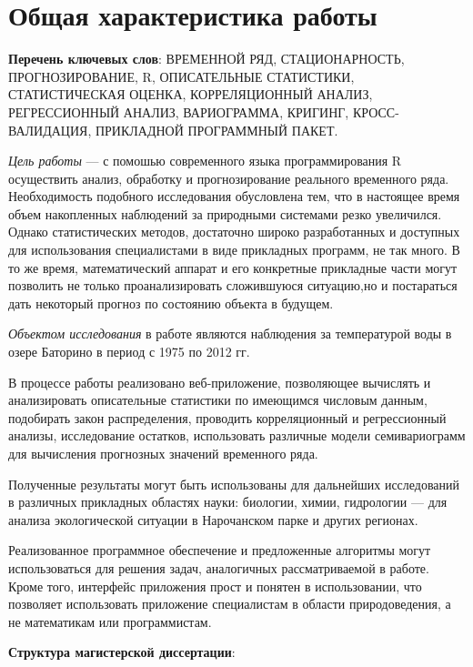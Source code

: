 
\newpage

\chapter*{Общая характеристика работы}

\textbf{Перечень ключевых слов}: ВРЕМЕННОЙ РЯД, СТАЦИОНАРНОСТЬ, ПРОГНОЗИРОВАНИЕ, R, ОПИСАТЕЛЬНЫЕ СТАТИСТИКИ, СТАТИСТИЧЕСКАЯ ОЦЕНКА, КОРРЕЛЯЦИОННЫЙ АНАЛИЗ, РЕГРЕССИОННЫЙ АНАЛИЗ, ВАРИОГРАММА, КРИГИНГ, КРОСС-ВАЛИДАЦИЯ, ПРИКЛАДНОЙ ПРОГРАММНЫЙ ПАКЕТ\@.

\textit{Цель работы} --- с помошью современного языка программирования R осуществить анализ, обработку и прогнозирование реального временного ряда. Необходимость подобного исследования обусловлена тем, что в настоящее время объем накопленных наблюдений за природными системами резко увеличился. Однако статистических методов, достаточно широко разработанных и доступных для использования специалистами в виде прикладных программ, не так много. В то же время, математический аппарат и его конкретные прикладные части могут позволить не только проанализировать сложившуюся ситуацию,но и постараться дать некоторый прогноз по состоянию объекта в будущем.

\textit{Объектом исследования} в работе являются наблюдения за температурой воды в озере Баторино в период с 1975 по 2012 гг.

В процессе работы реализовано веб-приложение, позволяющее вычислять и анализировать описательные статистики по имеющимся числовым данным, подобирать закон распределения, проводить корреляционный и регрессионный анализы, исследование остатков, использовать различные модели семивариограмм для вычисления прогнозных значений временного ряда.

Полученные результаты могут быть использованы для дальнейших исследований в различных прикладных областях науки: биологии, химии, гидрологии --- для анализа экологической ситуации в Нарочанском парке и других регионах.

Реализованное программное обеспечение и предложенные алгоритмы могут использоваться для решения задач, аналогичных рассматриваемой в работе. Кроме того, интерфейс приложения прост и понятен в использовании, что позволяет использовать приложение специалистам в области природоведения, а не математикам или программистам.

\textbf{Структура магистерской диссертации}:

